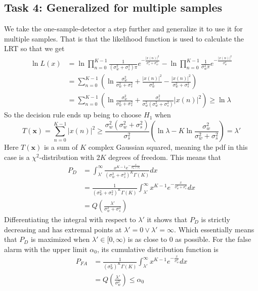 \subsection{Task 4: Generalized for multiple samples}
We take the one-sample-detector a step further and generalize it to use it for multiple samples. That is that the likelihood function is used to calculate the LRT so that we get
\begin{align}
    \ln L(x) & = \ln\prod_{n=0}^{K-1}\frac{1}{(\sigma_w^2+\sigma_s^2)\pi}e^{-\frac{|x(n)|^2}{\sigma_s^2+\sigma_w^2}}-\ln\prod_{n=0}^{K-1}\frac{1}{\sigma_w^2\pi}e^{-\frac{|x(n)|^2}{\sigma_w^2}}\nonumber\\
    & = \sum_{n=0}^{K-1}\left(\ln\frac{\sigma_w^2}{\sigma_w^2+\sigma_s^2} + \frac{|x(n)|^2}{\sigma_w^2}-\frac{|x(n)|^2}{\sigma_w^2+\sigma_s^2} \right)\nonumber\\
    & = \sum_{n=0}^{K-1}\left(\ln\frac{\sigma_w^2}{\sigma_w^2+\sigma_s^2} + \frac{\sigma_s^2}{\sigma_w^2(\sigma_w^2+\sigma_s^2)}|x(n)|^2\right)\geq\ln\lambda\nonumber
\end{align}
So the decision rule ends up being to choose $H_1$ when
\begin{equation}
    T(\mathbf{x}) = \sum_{n=0}^{K-1}|x(n)|^2 \geq \frac{\sigma_w^2(\sigma_w^2+\sigma_s^2)}{\sigma_s^2}\left(\ln\lambda-K\ln\frac{\sigma_w^2}{\sigma_w^2+\sigma_s^2}\right) = \lambda'
\end{equation}
Here $T(\mathbf{x})$ is a sum of $K$ complex Gaussian squared, meaning the pdf in this case is a $\chi^2$-distribution with $2K$ degrees of freedom. This means that
\begin{align}
    P_D & = \int_{\lambda'}^{\infty}\frac{x^{K-1}e^{-\frac{x}{\sigma_w^2+\sigma_s^2}}}{(\sigma_w^2+\sigma_s^2)^K\Gamma(K)}dx\nonumber\\
    & = \frac{1}{(\sigma_w^2+\sigma_s^2)^K\Gamma(K)}\int_{\lambda'}^{\infty}x^{K-1}e^{-\frac{x}{\sigma_w^2+\sigma_s^2}}dx\nonumber\\
    & = Q\left(\frac{\lambda'}{\sigma_w^2+\sigma_s^2}\right)
\end{align}
Differentiating the integral with respect to $\lambda'$ it shows that $P_D$ is strictly decreasing and has extremal points at $\lambda'=0\vee\lambda'=\infty$. Which essentially means that $P_D$ is maximized when $\lambda'\in[0,\infty)$ is as close to $0$ as possible. For the false alarm with the upper limit $\alpha_0$, its cumulative distribution function is
\begin{align}
    P_{FA} & = \frac{1}{(\sigma_w^2)^K\Gamma(K)}\int_{\lambda'}^{\infty}x^{K-1}e^{-\frac{x}{\sigma_w^2}}dx\nonumber\\
    & = Q\left(\frac{\lambda'}{\sigma_w^2}\right) \leq \alpha_0
\end{align}


